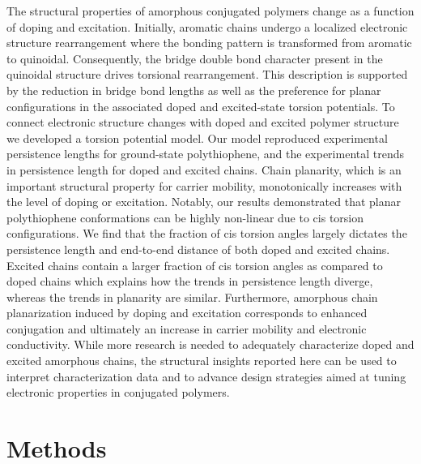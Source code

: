 The structural properties of amorphous conjugated polymers change as a function of doping and excitation. Initially, aromatic chains undergo a localized electronic structure rearrangement where the bonding pattern is transformed from aromatic to quinoidal. Consequently, the bridge double bond character present in the quinoidal structure drives torsional rearrangement. This description is supported by the reduction in bridge bond lengths as well as the preference for planar configurations in the associated doped and excited-state torsion potentials. To connect electronic structure changes with doped and excited polymer structure we developed a torsion potential model. Our model reproduced experimental persistence lengths for ground-state polythiophene, and the experimental trends in persistence length for doped and excited chains. Chain planarity, which is an important structural property for carrier mobility, monotonically increases with the level of doping or excitation. Notably, our results demonstrated that planar polythiophene conformations can be highly non-linear due to cis torsion configurations. We find that the fraction of cis torsion angles largely dictates the persistence length and end-to-end distance of both doped and excited chains. Excited chains contain a larger fraction of cis torsion angles as compared to doped chains which explains how the trends in persistence length diverge, whereas the trends in planarity are similar. Furthermore, amorphous chain planarization induced by doping and excitation corresponds to enhanced conjugation and ultimately an increase in carrier mobility and electronic conductivity. While more research is needed to adequately characterize doped and excited amorphous chains, the structural insights reported here can be used to interpret characterization data and to advance design strategies aimed at tuning electronic properties in conjugated polymers.

\section{Methods}

